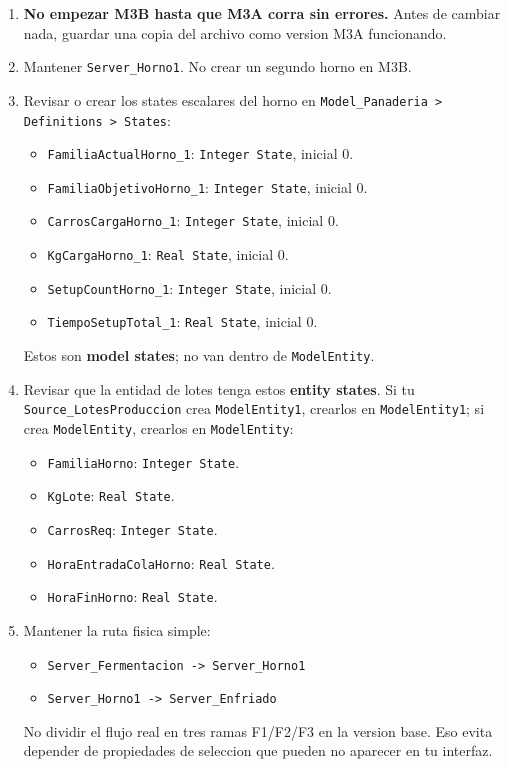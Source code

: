 \documentclass[11pt]{article}
\newcommand{\simio}[1]{\texttt{#1}}
\newcommand{\state}[1]{\texttt{#1}}
\begin{document}
\begin{enumerate}
  \item \textbf{No empezar M3B hasta que M3A corra sin errores.} Antes de cambiar nada, guardar una copia del archivo como version M3A funcionando.
  \item Mantener \simio{Server\_Horno1}. No crear un segundo horno en M3B.
  \item Revisar o crear los states escalares del horno en \simio{Model\_Panaderia > Definitions > States}:
  \begin{itemize}
    \item \state{FamiliaActualHorno\_1}: \simio{Integer State}, inicial 0.
    \item \state{FamiliaObjetivoHorno\_1}: \simio{Integer State}, inicial 0.
    \item \state{CarrosCargaHorno\_1}: \simio{Integer State}, inicial 0.
    \item \state{KgCargaHorno\_1}: \simio{Real State}, inicial 0.
    \item \state{SetupCountHorno\_1}: \simio{Integer State}, inicial 0.
    \item \state{TiempoSetupTotal\_1}: \simio{Real State}, inicial 0.
  \end{itemize}
  Estos son \textbf{model states}; no van dentro de \simio{ModelEntity}.

  \item Revisar que la entidad de lotes tenga estos \textbf{entity states}. Si tu \simio{Source\_LotesProduccion} crea \simio{ModelEntity1}, crearlos en \simio{ModelEntity1}; si crea \simio{ModelEntity}, crearlos en \simio{ModelEntity}:
  \begin{itemize}
    \item \state{FamiliaHorno}: \simio{Integer State}.
    \item \state{KgLote}: \simio{Real State}.
    \item \state{CarrosReq}: \simio{Integer State}.
    \item \state{HoraEntradaColaHorno}: \simio{Real State}.
    \item \state{HoraFinHorno}: \simio{Real State}.
  \end{itemize}

  \item Mantener la ruta fisica simple:
  \begin{itemize}
    \item \simio{Server\_Fermentacion -> Server\_Horno1}
    \item \simio{Server\_Horno1 -> Server\_Enfriado}
  \end{itemize}
  No dividir el flujo real en tres ramas F1/F2/F3 en la version base. Eso evita depender de propiedades de seleccion que pueden no aparecer en tu interfaz.


\end{enumerate}
\end{document}
